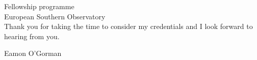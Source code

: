 \documentclass[10pt]{letter} %
\begin{document}
\begin{letter}{Fellowship programme \\
European Southern Observatory \\
}
Thank you for taking the time to consider my credentials and I look forward to hearing from you.

Eamon O'Gorman
\\
\\
\\
\\
\\
\\
\\
\\
\end{letter}
 
\end{document}
